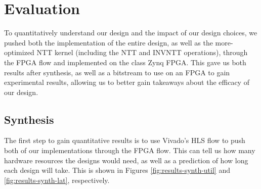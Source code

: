 
\section*{Evaluation}

To quantitatively understand our design and the impact of
our design choices, we pushed both the implementation of
the entire design, as well as the more-optimized NTT kernel
(including the NTT and INVNTT operations),
through the FPGA flow and implemented on the class Zynq FPGA.
This gave us both results after synthesis, as well as a
bitstream to use on an FPGA to gain experimental results,
allowing us to better gain takeaways about the efficacy of
our design.


\subsection*{Synthesis}

The first step to gain quantitative results is to use
Vivado's HLS flow to push both of our implementations
through the FPGA flow. This can tell us how many hardware
resources the designs would need, as well as a prediction
of how long each design will take. This is shown in Figures
\ref{fig:results-synth-util} and \ref{fig:results-synth-lat},
respectively.

